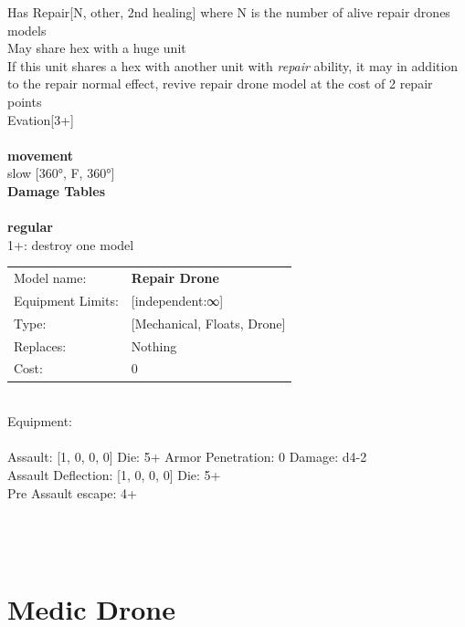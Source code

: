 \noindent Has Repair[N, other, 2nd healing] where N is the number of alive repair drones models\\ 
May share hex with a huge unit\\ 
If this unit shares a hex with another unit with {{\it repair}} ability, it may in addition to the repair normal effect, revive repair drone model at the cost of 2 repair points\\ 
Evation[3+]\\ 


\ \\ {\bf movement } \\
slow [360°, F, 360°] \\


{\bf Damage Tables} \\
\ \\ {\bf regular } \\
1+: destroy one model \\


\noindent
\begin{tabular}{ll}
Model name: &{\bf Repair Drone } \\
Equipment Limits: &[independent:∞] \\
Type: &[Mechanical, Floats, Drone] \\
Replaces: &Nothing \\
Cost: & 0\\
\end{tabular}
\ \\
Equipment:  \\
\ \\
Assault: [1, 0, 0, 0] Die: 5+ Armor Penetration: 0 Damage: d4-2 \\
Assault Deflection: [1, 0, 0, 0] Die: 5+\\
\indent Pre Assault escape: 4+\\ 
 
\ \\

\ \\
 
\ \\













\clearpage

\section{ Medic Drone }

